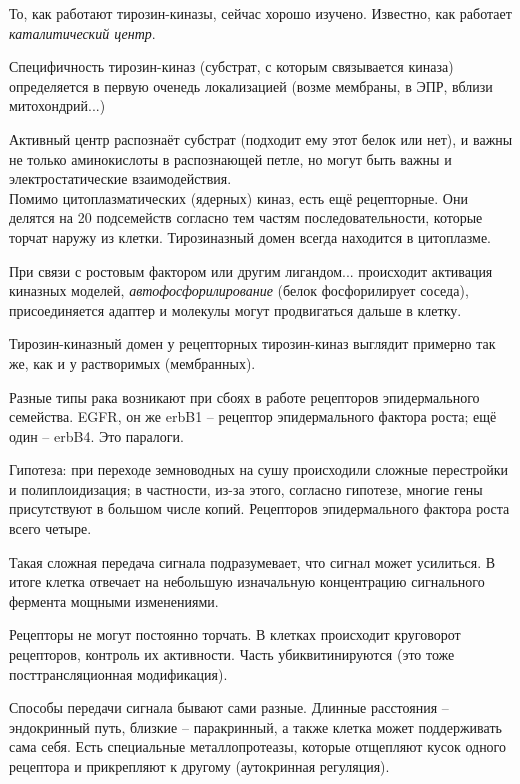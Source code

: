 \documentclass[main.tex]{subfiles}
\begin{document}

То, как работают тирозин-киназы, сейчас хорошо изучено.
Известно, как работает \emph{каталитический центр}.

Специфичность тирозин-киназ (субстрат, с которым связывается киназа) определяется в первую оченедь локализацией (возме мембраны, в ЭПР, вблизи митохондрий...) %

Активный центр распознаёт субстрат (подходит ему этот белок или нет), и важны не только аминокислоты в распознающей петле, но могут быть важны и электростатические взаимодействия. \\

Помимо цитоплазматических (ядерных) киназ, есть ещё рецепторные.
Они делятся на 20 подсемейств согласно тем частям последовательности, которые торчат наружу из клетки.
Тирозиназный домен всегда находится в цитоплазме.

При связи с ростовым фактором или другим лигандом... происходит активация киназных моделей, \emph{автофосфорилирование} (белок фосфорилирует соседа), присоединяется адаптер и молекулы могут продвигаться дальше в клетку.

Тирозин-киназный домен у рецепторных тирозин-киназ выглядит примерно так же, как и у растворимых (мембранных). %

Разные типы рака возникают при сбоях в работе рецепторов эпидермального семейства.
EGFR, он же erbB1 -- рецептор эпидермального фактора роста; ещё один -- erbB4.
Это паралоги.

Гипотеза: при переходе земноводных на сушу происходили сложные перестройки и полиплоидизация; в частности, из-за этого, согласно гипотезе, многие гены присутствуют в большом числе копий.
Рецепторов эпидермального фактора роста всего четыре.

Такая сложная передача сигнала подразумевает, что сигнал может усилиться.
В итоге клетка отвечает на небольшую изначальную концентрацию сигнального фермента мощными изменениями.

Рецепторы не могут постоянно торчать.
В клетках происходит круговорот рецепторов, контроль их активности.
Часть убиквитинируются (это тоже посттрансляционная модификация). %

Способы передачи сигнала бывают сами разные.
Длинные расстояния -- эндокринный путь, близкие -- паракринный, а также клетка может поддерживать сама себя.
Есть специальные металлопротеазы, которые отщепляют кусок одного рецептора и прикрепляют к другому (аутокринная регуляция).
\end{document}
